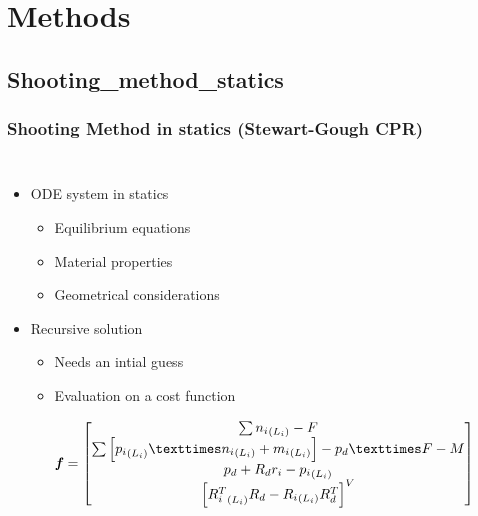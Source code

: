 \documentclass[compress]{thesisbeamer}
\begin{document}
	\section{Methods}	
		\subsection{Shooting_method_statics}
        \begin{frame}
        	\frametitle{Shooting Method in statics (Stewart-Gough CPR)}
        	\begin{columns}
			\begin{itemize}%
  				\item ODE system in statics
  				\begin{itemize}
  					\item Equilibrium equations
  					\item Material properties
  					\item Geometrical considerations
  				\end{itemize}
  				\item Recursive solution
  				\begin{itemize}			
  					\item Needs an intial guess
  					\item Evaluation on a cost function  
  					\begin{fleqn}
  					\begin{equation}
  						\textbf{\textit{f}} = 
  						\begin{bmatrix}
  							\sum{ {{n}_{i}}_{\left({L}_{i} \right)} }- F \\
  							\sum{ \left[{{p}_{i}}_{\left({L}_{i} \right)} × {{n}_{i}}_{\left({L}_{i} \right)} + {{m}_{i}}_{\left({L}_{i} \right)} \right] } - {p}_{d} × F-M \\
  							{p}_{d} + {R}_{d} {r}_{i} - {{p}_{i}}_{\left({L}_{i} \right)} \\
  							{\left[{{R}_{i}^{T}}_{\left({L}_{i} \right)} {R}_{d} - {{R}_{i}}_{\left({L}_{i} \right)} {R}_{d}^{T} \right]}^{V} 
  						\end{bmatrix}
  					\end{equation}\vfill
  					\end{fleqn}
  				\end{itemize}
 			\end{itemize}
			\begin{figure}[h]
				\centering

\end{figure}
\end{columns}
\end{frame}
\end{document}
